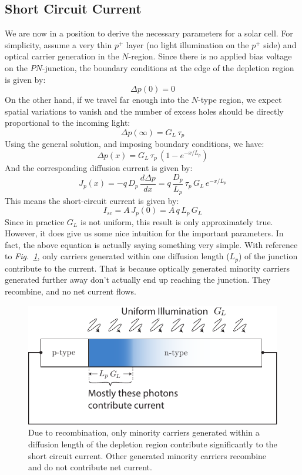 \subsection{Short Circuit Current}
We are now in a position to derive the necessary parameters for a solar cell.  For simplicity, assume a very thin $p^+$ layer (no light illumination on the $p^+$ side) and optical carrier generation in the $N$-region.  Since there is no applied bias voltage on the $PN$-junction, the boundary conditions at the edge of the depletion region is given by:
    \begin{equation} 
        \Delta p(0) = 0  
    \end{equation}
On the other hand, if we travel far enough into the $N$-type region, we expect spatial variations to vanish and the number of excess holes should be directly proportional to the incoming light:
    \begin{equation} 
        \Delta p(\infty) = G_L\,\tau_p  
    \end{equation}
Using the general solution, and imposing boundary conditions, we have:
    \begin{equation} 
        \Delta p(x) = G_L\,\tau_p\,\left(1 - e^{-x/L_p} \right)   
    \end{equation}
And the corresponding diffusion current is given by:
    \begin{equation} 
        J_p(x) = -q\,D_p\,\frac{d\Delta p}{dx} = q\,\frac{D_p}{L_p}\,\tau_p\,G_L\,e^{-x/L_p}  
    \end{equation}
This means the short-circuit current is given by:
    \begin{equation} 
        I_{sc} = A\,J_p(0) = A\,q\,L_p\,G_L
    \end{equation}
Since in practice $G_L$ is not uniform, this result is only approximately true. However, it does give us some nice intuition for the important parameters.  In fact, the above equation is actually saying something very simple.  With reference to \emph{Fig.~\ref{fig:solar_cell_region}}, only carriers generated within one diffusion length ($L_p$) of the junction contribute to the current.  That is because optically generated minority carriers generated further away don't actually end up reaching the junction.  They recombine, and no net current flows.
\begin{figure}[H]
\centering
\includegraphics[width=.5\columnwidth]{solar_cell_region}
\caption{Due to recombination, only minority carriers generated within a diffusion length of the depletion region contribute significantly to the short circuit current.  Other generated minority carriers recombine and do not contribute net current.}
\label{fig:solar_cell_region}
\end{figure}
